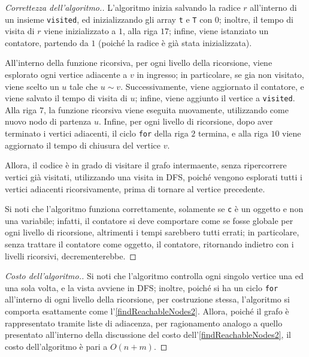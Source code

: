 \documentclass[a4paper, 12pt]{report}
\begin{document}
    \begin{proof}[Correttezza dell'algoritmo.]
        L'algoritmo inizia salvando la radice $r$ all'interno di un insieme \texttt{visited}, ed inizializzando gli array \texttt{t} e \texttt{T} con $0$; inoltre, il tempo di visita di $r$ viene inizializzato a $1$, alla riga $17$; infine, viene istanziato un contatore, partendo da $1$ (poiché la radice è già stata inizializzata).

        All'interno della funzione ricorsiva, per ogni livello della ricorsione, viene esplorato ogni vertice adiacente a $v$ in ingresso; in particolare, se gia non visitato, viene scelto un $u$ tale che $u \sim v$. Successivamente, viene aggiornato il contatore, e viene salvato il tempo di visita di $u$; infine, viene aggiunto il vertice a \texttt{visited}. Alla riga $7$, la funzione ricorsiva viene eseguita nuovamente, utilizzando come nuovo nodo di partenza $u$. Infine, per ogni livello di ricorsione, dopo aver terminato i vertici adiacenti, il ciclo \texttt{for} della riga $2$ termina, e alla riga $10$ viene aggiornato il tempo di chiusura del vertice $v$.

        Allora, il codice è in grado di visitare il grafo intermaente, senza ripercorrere vertici già visitati, utilizzando una visita in DFS, poiché vengono esplorati tutti i vertici adiacenti ricorsivamente, prima di tornare al vertice precedente.

        Si noti che l'algoritmo funziona correttamente, solamente se \texttt{c} è un oggetto e non una variabile; infatti, il contatore si deve comportare come se fosse globale per ogni livello di ricorsione, altrimenti i tempi sarebbero tutti errati; in particolare, senza trattare il contatore come oggetto, il contatore, ritornando indietro con i livelli ricorsivi, decrementerebbe.
    \end{proof}

    \begin{proof}[Costo dell'algoritmo.]
        Si noti che l'algoritmo controlla ogni singolo vertice una ed una sola volta, e la vista avviene in DFS; inoltre, poiché si ha un ciclo \texttt{for} all'interno di ogni livello della ricorsione, per costruzione stessa, l'algoritmo si comporta esattamente come l'\cref{findReachableNodes2}. Allora, poiché il grafo è rappresentato tramite liste di adiacenza, per ragionamento analogo a quello presentato all'interno della discussione del costo dell'\cref{findReachableNodes2}, il costo dell'algoritmo è pari a $O(n + m)$.
    \end{proof}
\end{document}

